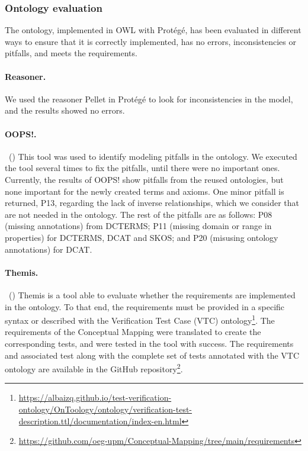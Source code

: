 \subsubsection{Ontology evaluation}\label{sec:eval}


The ontology, implemented in OWL with Protégé, has been evaluated in different ways to ensure that it is correctly implemented, has no errors, inconsistencies or pitfalls, and meets the requirements.

\noindent\paragraph{\textbf{Reasoner.}} We used the reasoner Pellet in Protégé to look for inconsistencies in the model, and the results showed no errors.

\noindent\paragraph{\textbf{OOPS!.}}~(\cite{poveda2014oops}) This tool was used to identify modeling pitfalls in the ontology. We executed the tool several times to fix the pitfalls, until there were no important ones. Currently, the results of OOPS! show pitfalls from the reused ontologies, but none important for the newly created terms and axioms. One minor pitfall is returned, P13, regarding the lack of inverse relationships, which we consider that are not  needed in the ontology. The rest of the pitfalls are as follows: P08 (missing annotations) from DCTERMS; P11 (missing domain or range in properties) for DCTERMS, DCAT and SKOS; and P20 (misusing ontology annotations) for DCAT.

\noindent\paragraph{\textbf{Themis.}}~(\cite{fernandez2021themis}) Themis is a tool able to evaluate whether the requirements are implemented in the ontology. To that end, the requirements must be provided in a specific syntax or described with the Verification Test Case (VTC) ontology\footnote{\url{https://albaizq.github.io/test-verification-ontology/OnToology/ontology/verification-test-description.ttl/documentation/index-en.html}}. The requirements of the Conceptual Mapping were translated to create the corresponding tests, and were tested in the tool with success. The requirements and associated test along with the complete set of tests annotated with the VTC ontology are available in the GitHub repository\footnote{\url{https://github.com/oeg-upm/Conceptual-Mapping/tree/main/requirements}}.


